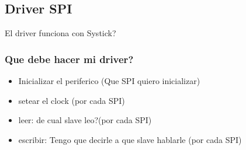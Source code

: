 \documentclass[10pt,a4paper]{article}
\begin{document}
\subsection{Driver SPI}
El driver funciona con Systick? 
\subsubsection{Que debe hacer mi driver?}
\begin{itemize}
\item Inicializar el periferico (Que SPI quiero inicializar)
\item setear el clock (por cada SPI)
\item leer: de cual slave leo?(por cada SPI)
\item escribir: Tengo que decirle a que slave hablarle (por cada SPI)
\end{itemize}
\end{document}
